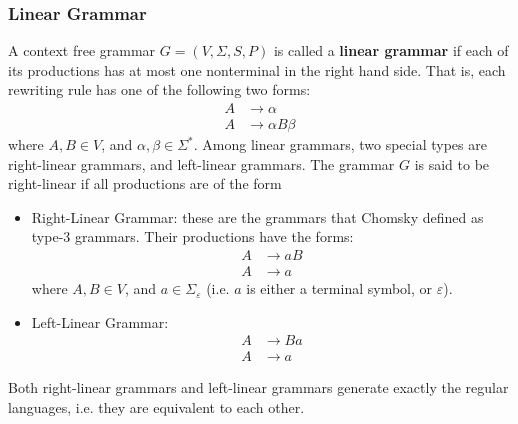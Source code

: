 \documentclass{article}
\newcommand{\emptystr}{\varepsilon}
\theoremstyle{definition}
\begin{document}
\subsubsection*{Linear Grammar}
A context free grammar $G = (V, \Sigma, S, P)$ is called a \textbf{linear
grammar} if each of its productions has at most one nonterminal in the right
hand side. That is, each rewriting rule has one of the following two forms:
\begin{align*}
	A &\to \alpha \\
	A &\to \alpha B \beta
\end{align*}
where $A, B \in V$, and $\alpha, \beta \in \Sigma^*$.
Among linear grammars, two special types are right-linear grammars, and
left-linear grammars. The grammar $G$ is said to be right-linear if all
productions are of the form
\begin{itemize}
\item Right-Linear Grammar: these are the grammars that Chomsky defined as type-3 grammars. Their productions have the forms:
\begin{align*}
	A &\to aB\\
	A &\to a
\end{align*}
where $A,B \in V$, and $a \in \Sigma_{\emptystr}$ (i.e. $a$ is either a terminal
symbol, or $\emptystr$).
\item Left-Linear Grammar:
\begin{align*}
	A &\to Ba\\
	A &\to a
\end{align*}
\end{itemize}
Both right-linear grammars and left-linear grammars generate exactly the regular
languages, i.e. they are equivalent to each other.
\end{document}
